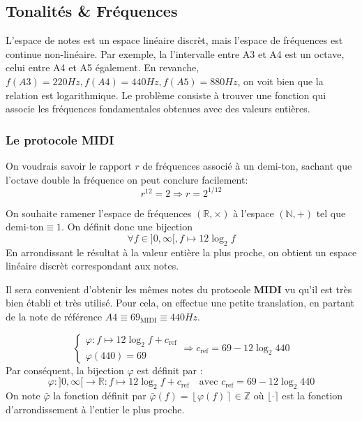\documentclass[]{article}
\begin{document}
\hypertarget{tonalites-frequences}{%
\subsection{Tonalités \& Fréquences}\label{tonalites-frequences}}

L'espace de notes est un espace linéaire discrèt, mais l'espace de
fréquences est continue non-linéaire. Par exemple, la l'intervalle entre
A3 et A4 est un octave, celui entre A4 et A5 également. En revanche,
\(f(A3)=220Hz, f(A4)=440Hz, f(A5)=880Hz\), on voit bien que la relation
est logarithmique. Le problème consiste à trouver une fonction qui
associe les fréquences fondamentales obtenues avec des valeurs entières.

\hypertarget{le-protocole-midi}{%
\subsubsection{Le protocole MIDI}\label{le-protocole-midi}}

On voudrais savoir le rapport \(r\) de fréquences associé à un demi-ton,
sachant que l'octave double la fréquence on peut conclure facilement:
\[ r^{12} = 2 \Rightarrow r=2^{1/12} \]

On souhaite ramener l'espace de fréquences \((\mathbb{R},\times)\) à
l'espace \((\mathbb{N},+)\) tel que \(\boxed{\text{demi-ton}\equiv 1}\).
On définit donc une bijection
\[\forall f\in]0,\infty[, f\mapsto 12 \log_2 f \] En arrondissant le
résultat à la valeur entière la plus proche, on obtient un espace
linéaire discrèt correspondant aux notes.

Il sera convenient d'obtenir les mêmes notes du protocole \textbf{MIDI}
vu qu'il est très bien établi et très utilisé. Pour cela, on effectue
une petite translation, en partant de la note de référence
\(A4\equiv 69_{\text{MIDI}} \equiv 440Hz\).

\[\begin{cases}
\varphi:f\mapsto 12\log_2 f + c_{\text{ref}}\\
\varphi(440) = 69
\end{cases}\Rightarrow c_{\text{ref}} = 69 - 12\log_2 440\] Par
conséquent, la bijection \(\varphi\) est définit par :
\[\varphi: ]0,\infty[ \rightarrow \mathbb{R} : f \mapsto 12\log_2 f + c_{\text{ref}}
\quad\text{avec } c_{\text{ref}}=69 - 12\log_2 440\] On note
\(\bar{\varphi}\) la fonction définit par
\(\bar{\varphi}(f)=\left\lfloor\varphi(f)\right\rceil\in\mathbb{Z}\) où
\(\lfloor\cdot\rceil\) est la fonction d'arrondissement à l'entier le
plus proche.
\end{document}
